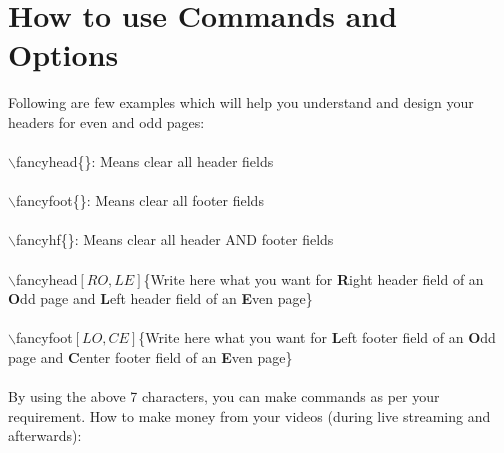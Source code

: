 \documentclass{book}
\begin{document}
\section{How to use Commands and Options}
Following are few examples which will help you understand and design your headers for even and odd pages:\\\\
$\backslash$fancyhead\{\}: Means clear all header fields\\\\
$\backslash$fancyfoot\{\}: Means clear all footer fields\\\\
$\backslash$fancyhf\{\}: Means clear all header AND footer fields\\\\
$\backslash$fancyhead$[RO,LE]$\{Write here what you want for \textbf{R}ight header field of an \textbf{O}dd page and \textbf{L}eft header field of an \textbf{E}ven page\}\\\\
$\backslash$fancyfoot$[LO,CE]$\{Write here what you want for \textbf{L}eft footer field of an \textbf{O}dd page and \textbf{C}enter footer field of an \textbf{E}ven page\}\\\\
By using the above 7 characters, you can make commands as per your requirement. 
How to make money from your videos (during live streaming and afterwards):
\end{document}
